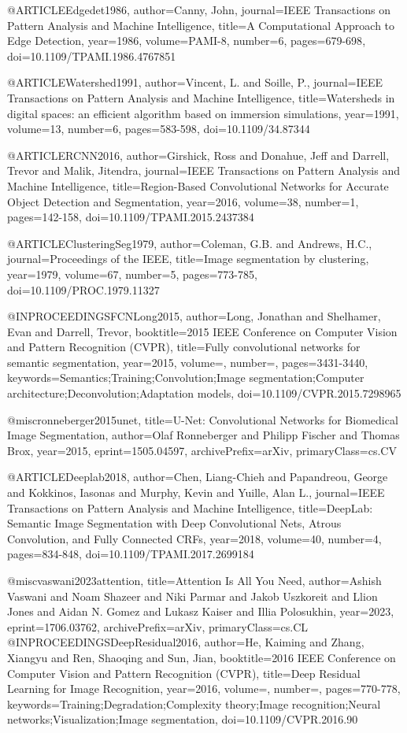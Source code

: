 @ARTICLE{Edgedet1986,
author={Canny, John},
journal={IEEE Transactions on Pattern Analysis and Machine Intelligence},
title={A Computational Approach to Edge Detection},
year={1986},
volume={PAMI-8},
number={6},
pages={679-698},
doi={10.1109/TPAMI.1986.4767851}}

@ARTICLE{Watershed1991,
author={Vincent, L. and Soille, P.},
journal={IEEE Transactions on Pattern Analysis and Machine Intelligence},
title={Watersheds in digital spaces: an efficient algorithm based on immersion simulations},
year={1991},
volume={13},
number={6},
pages={583-598},
doi={10.1109/34.87344}}

@ARTICLE{RCNN2016,
author={Girshick, Ross and Donahue, Jeff and Darrell, Trevor and Malik, Jitendra},
journal={IEEE Transactions on Pattern Analysis and Machine Intelligence},
title={Region-Based Convolutional Networks for Accurate Object Detection and Segmentation},
year={2016},
volume={38},
number={1},
pages={142-158},
doi={10.1109/TPAMI.2015.2437384}}

@ARTICLE{ClusteringSeg1979,
author={Coleman, G.B. and Andrews, H.C.},
journal={Proceedings of the IEEE},
title={Image segmentation by clustering},
year={1979},
volume={67},
number={5},
pages={773-785},
doi={10.1109/PROC.1979.11327}}

@INPROCEEDINGS{FCNLong2015,
author={Long, Jonathan and Shelhamer, Evan and Darrell, Trevor},
booktitle={2015 IEEE Conference on Computer Vision and Pattern Recognition (CVPR)},
title={Fully convolutional networks for semantic segmentation},
year={2015},
volume={},
number={},
pages={3431-3440},
keywords={Semantics;Training;Convolution;Image segmentation;Computer architecture;Deconvolution;Adaptation models},
doi={10.1109/CVPR.2015.7298965}}

@misc{ronneberger2015unet,
title={U-{N}et: Convolutional Networks for Biomedical Image Segmentation},
author={Olaf Ronneberger and Philipp Fischer and Thomas Brox},
year={2015},
eprint={1505.04597},
archivePrefix={arXiv},
primaryClass={cs.CV}
}

@ARTICLE{Deeplab2018,
author={Chen, Liang-Chieh and Papandreou, George and Kokkinos, Iasonas and Murphy, Kevin and Yuille, Alan L.},
journal={IEEE Transactions on Pattern Analysis and Machine Intelligence},
title={DeepLab: Semantic Image Segmentation with Deep Convolutional Nets, {A}trous Convolution, and Fully Connected {CRF}s},
year={2018},
volume={40},
number={4},
pages={834-848},
doi={10.1109/TPAMI.2017.2699184}}

@misc{vaswani2023attention,
title={Attention Is All You Need},
author={Ashish Vaswani and Noam Shazeer and Niki Parmar and Jakob Uszkoreit and Llion Jones and Aidan N. Gomez and Lukasz Kaiser and Illia Polosukhin},
year={2023},
eprint={1706.03762},
archivePrefix={arXiv},
primaryClass={cs.CL}
}
@INPROCEEDINGS{DeepResidual2016,
author={He, Kaiming and Zhang, Xiangyu and Ren, Shaoqing and Sun, Jian},
booktitle={2016 IEEE Conference on Computer Vision and Pattern Recognition (CVPR)},
title={Deep Residual Learning for Image Recognition},
year={2016},
volume={},
number={},
pages={770-778},
keywords={Training;Degradation;Complexity theory;Image recognition;Neural networks;Visualization;Image segmentation},
doi={10.1109/CVPR.2016.90}}

